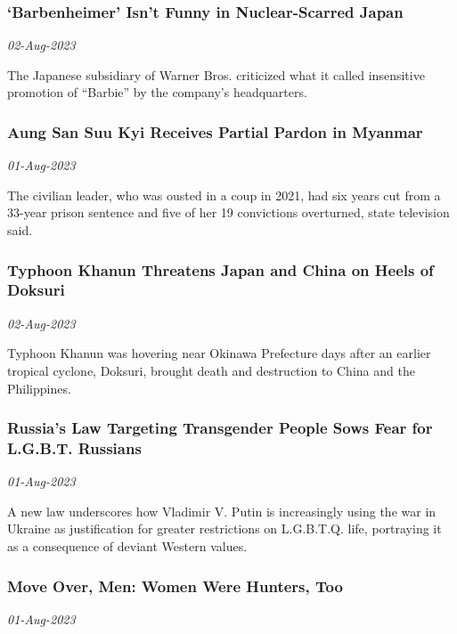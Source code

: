 \subsubsection{‘Barbenheimer’ Isn’t Funny in Nuclear-Scarred Japan \href{https://www.nytimes.com/2023/08/01/world/asia/japan-barbenheimer.html}{}}
\textit{02-Aug-2023}

The Japanese subsidiary of Warner Bros. criticized what it called insensitive promotion of “Barbie” by the company’s headquarters.
\subsubsection{Aung San Suu Kyi Receives Partial Pardon in Myanmar \href{https://www.nytimes.com/2023/08/01/world/asia/aung-san-suu-kyi-pardon-myanmar.html}{}}
\textit{01-Aug-2023}

The civilian leader, who was ousted in a coup in 2021, had six years cut from a 33-year prison sentence and five of her 19 convictions overturned, state television said.
\subsubsection{Typhoon Khanun Threatens Japan and China on Heels of Doksuri \href{https://www.nytimes.com/2023/08/01/world/asia/typhoon-khanun-japan-china-doksuri.html}{}}
\textit{02-Aug-2023}

Typhoon Khanun was hovering near Okinawa Prefecture days after an earlier tropical cyclone, Doksuri, brought death and destruction to China and the Philippines.
\subsubsection{Russia’s Law Targeting Transgender People Sows Fear for L.G.B.T. Russians \href{https://www.nytimes.com/2023/08/01/world/europe/russia-transgender-ban.html}{}}
\textit{01-Aug-2023}

A new law underscores how Vladimir V. Putin is increasingly using the war in Ukraine as justification for greater restrictions on L.G.B.T.Q. life, portraying it as a consequence of deviant Western values.
\subsubsection{Move Over, Men: Women Were Hunters, Too \href{https://www.nytimes.com/2023/08/01/science/anthropology-women-hunting.html}{}}
\textit{01-Aug-2023}

